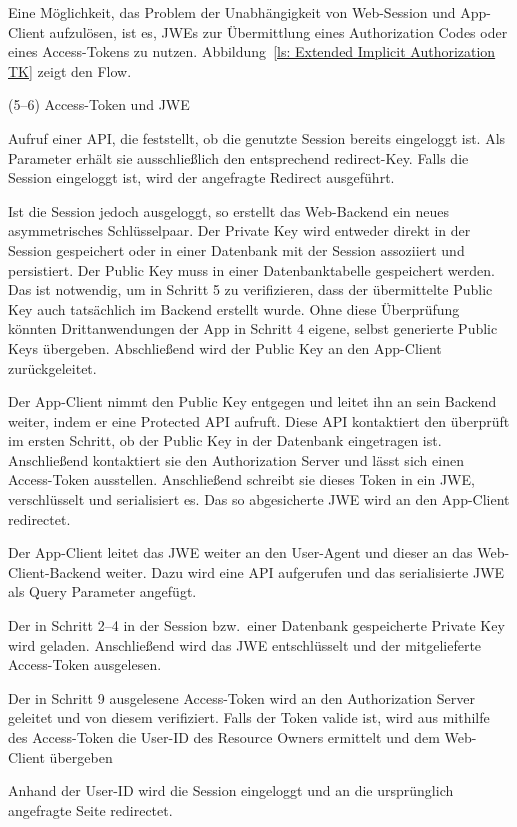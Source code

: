 Eine Möglichkeit, das Problem der Unabhängigkeit von Web-Session und App-Client
aufzulösen, ist es, JWEs zur Übermittlung eines Authorization Codes oder eines
Access-Tokens zu nutzen. Abbildung~\ref{ls: Extended Implicit Authorization TK}
zeigt den Flow. 
\begin{labeling}{(5--6) Access-Token und JWE}
    \item [(1) propose/redirect] Aufruf einer API, die feststellt, ob die
    genutzte Session bereits eingeloggt ist. Als Parameter erhält sie
    ausschließlich den entsprechend redirect-Key. Falls die Session eingeloggt
    ist, wird der angefragte Redirect ausgeführt.
    \item[(2--4) Key proposal] Ist die Session jedoch ausgeloggt, so erstellt das
    Web-Backend ein neues asymmetrisches Schlüsselpaar. Der Private Key wird
    entweder direkt in der Session gespeichert oder in einer Datenbank mit der
    Session assoziiert und persistiert. Der Public Key muss in einer
    Datenbanktabelle gespeichert werden. Das ist notwendig, um in Schritt 5 zu
    verifizieren, dass der übermittelte Public Key auch tatsächlich im Backend
    erstellt wurde. Ohne diese Überprüfung könnten Drittanwendungen der App in
    Schritt 4 eigene, selbst generierte Public Keys  übergeben.
    Abschließend wird der Public Key an den App-Client zurückgeleitet.
    \item[(5--6) Access-Token und JWE] Der App-Client nimmt den Public Key
    entgegen und leitet ihn an sein Backend weiter, indem er eine Protected API
    aufruft. Diese API kontaktiert den überprüft im
    ersten Schritt, ob der Public Key in der Datenbank eingetragen ist.
    Anschließend kontaktiert sie den Authorization Server und lässt sich einen
    Access-Token ausstellen. Anschließend schreibt sie dieses Token in ein JWE,
    verschlüsselt und serialisiert es. Das so abgesicherte JWE wird an den
    App-Client redirectet.
    \item[(7--8) JWE Weiterleitung] Der App-Client leitet das JWE weiter an
    den User-Agent und dieser an das Web-Client-Backend weiter. Dazu wird eine
    API aufgerufen und das serialisierte JWE als Query Parameter angefügt.
    \item[(9) JWE Entschlüsselung] Der in Schritt 2--4 in der Session bzw.\
    einer Datenbank gespeicherte Private Key wird geladen. Anschließend wird das
    JWE entschlüsselt und der mitgelieferte Access-Token ausgelesen.
    \item[(10--11) User Identifizierung] Der in Schritt 9 ausgelesene
    Access-Token wird an den Authorization Server geleitet und von diesem
    verifiziert. Falls der Token valide ist, wird aus mithilfe des Access-Token
    die User-ID des Resource Owners ermittelt und dem Web-Client übergeben
    \item[(12--13) Login \& Redirect] Anhand der User-ID wird die Session
    eingeloggt und an die ursprünglich angefragte Seite redirectet.


\end{labeling}
